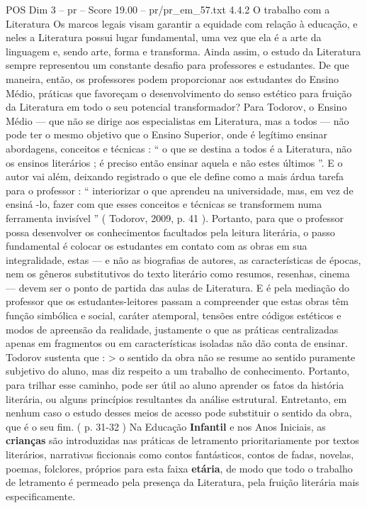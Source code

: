 \begin{textsample}{POS Dim 3 – pr – Score 19.00 – pr/pr\_em\_57.txt}  \label{ex:f3_pos_157}
4.4.2 O trabalho com a Literatura Os marcos legais visam garantir a equidade com relação à educação, e neles a Literatura possui lugar fundamental, uma vez que ela é a arte da linguagem e, sendo arte, forma e transforma.
Ainda assim, o estudo da Literatura sempre representou um constante desafio para professores e estudantes.
De que maneira, então, os professores podem proporcionar aos estudantes do Ensino Médio, práticas que favoreçam o desenvolvimento do senso estético para fruição da Literatura em todo o seu potencial transformador?
Para Todorov, o Ensino Médio — que não se dirige aos especialistas em Literatura, mas a todos — não pode ter o mesmo objetivo que o Ensino Superior, onde é legítimo ensinar abordagens, conceitos e técnicas : “ o que se destina a todos é a Literatura, não os ensinos literários ; é preciso então ensinar aquela e não estes últimos ”.
E o autor vai além, deixando registrado o que ele define como a mais árdua tarefa para o professor : “ interiorizar o que aprendeu na universidade, mas, em vez de ensiná -lo, fazer com que esses conceitos e técnicas se transformem numa ferramenta invisível ” ( Todorov, 2009, p. 41 ).
Portanto, para que o professor possa desenvolver os conhecimentos facultados pela leitura literária, o passo fundamental é colocar os estudantes em contato com as obras em sua integralidade, estas — e não as biografias de autores, as características de épocas, nem os gêneros substitutivos do texto literário como resumos, resenhas, cinema — devem ser o ponto de partida das aulas de Literatura.
E é pela mediação do professor que os estudantes-leitores passam a compreender que estas obras têm função simbólica e social, caráter atemporal, tensões entre códigos estéticos e modos de apreensão da realidade, justamente o que as práticas centralizadas apenas em fragmentos ou em características isoladas não dão conta de ensinar.
Todorov sustenta que : > o sentido da obra não se resume ao sentido puramente subjetivo do aluno, mas diz respeito a um trabalho de conhecimento.
Portanto, para trilhar esse caminho, pode ser útil ao aluno aprender os fatos da história literária, ou alguns princípios resultantes da análise estrutural.
Entretanto, em nenhum caso o estudo desses meios de acesso pode substituir o sentido da obra, que é o seu fim. ( p. 31-32 ) Na Educação \textbf{Infantil} e nos Anos Iniciais, as \textbf{crianças} são introduzidas nas práticas de letramento prioritariamente por textos literários, narrativas ficcionais como contos fantásticos, contos de fadas, novelas, poemas, folclores, próprios para esta faixa \textbf{etária}, de modo que todo o trabalho de letramento é permeado pela presença da Literatura, pela fruição literária mais especificamente.

\end{textsample}
